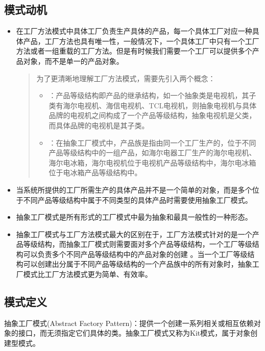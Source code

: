 \documentclass[letterpaper,10pt,english]{sphinxmanual}
\begin{document}
\subsection{模式动机}
\label{\detokenize{creational_patterns/abstract_factory:id2}}\begin{itemize}
\item {} 
\sphinxAtStartPar
在工厂方法模式中具体工厂负责生产具体的产品，每一个具体工厂对应一种具体产品，工厂方法也具有唯一性，一般情况下，一个具体工厂中只有一个工厂方法或者一组重载的工厂方法。但是有时候我们需要一个工厂可以提供多个产品对象，而不是单一的产品对象。
\begin{quote}

\sphinxAtStartPar
为了更清晰地理解工厂方法模式，需要先引入两个概念：
\begin{itemize}
\item {} 
\sphinxAtStartPar
{} ：产品等级结构即产品的继承结构，如一个抽象类是电视机，其子类有海尔电视机、海信电视机、TCL电视机，则抽象电视机与具体品牌的电视机之间构成了一个产品等级结构，抽象电视机是父类，而具体品牌的电视机是其子类。

\item {} 
\sphinxAtStartPar
{} ：在抽象工厂模式中，产品族是指由同一个工厂生产的，位于不同产品等级结构中的一组产品，如海尔电器工厂生产的海尔电视机、海尔电冰箱，海尔电视机位于电视机产品等级结构中，海尔电冰箱位于电冰箱产品等级结构中。

\end{itemize}
\end{quote}

\item {} 
\sphinxAtStartPar
当系统所提供的工厂所需生产的具体产品并不是一个简单的对象，而是多个位于不同产品等级结构中属于不同类型的具体产品时需要使用抽象工厂模式。

\item {} 
\sphinxAtStartPar
抽象工厂模式是所有形式的工厂模式中最为抽象和最具一般性的一种形态。

\item {} 
\sphinxAtStartPar
抽象工厂模式与工厂方法模式最大的区别在于，工厂方法模式针对的是一个产品等级结构，而抽象工厂模式则需要面对多个产品等级结构，一个工厂等级结构可以负责多个不同产品等级结构中的产品对象的创建 。当一个工厂等级结构可以创建出分属于不同产品等级结构的一个产品族中的所有对象时，抽象工厂模式比工厂方法模式更为简单、有效率。

\end{itemize}


\subsection{模式定义}
\label{\detokenize{creational_patterns/abstract_factory:id3}}
\sphinxAtStartPar
抽象工厂模式(Abstract Factory Pattern)：提供一个创建一系列相关或相互依赖对象的接口，而无须指定它们具体的类。抽象工厂模式又称为Kit模式，属于对象创建型模式。
\end{document}

